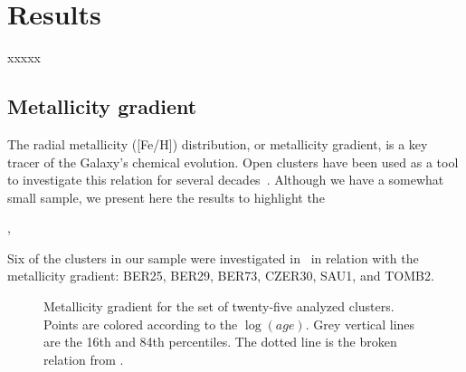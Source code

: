\documentclass{aa}
\begin{document}
\section{Results}
 \label{sec:results}

 xxxxx


 \subsection{Metallicity gradient}
  \label{ssec:met_gradient}

  The radial metallicity ([Fe/H]) distribution, or metallicity gradient, is a
  key tracer of the Galaxy's chemical evolution. Open clusters have been used as
  a tool to investigate this relation for several decades~\citep{Janes_1979}.
  Although we have a somewhat small sample, we present here the results to
  highlight the 

  \cite{Donor_2020}, 

  Six of the clusters in our sample were investigated in~\cite{Netopil_2021} in
  relation with the metallicity gradient: BER25, BER29, BER73, CZER30, SAU1,
  and TOMB2.


  \begin{figure}
   \caption{Metallicity gradient for the set of twenty-five analyzed clusters.
   Points are colored according to the $\log(age)$. Grey vertical lines are the
   16th and 84th percentiles. The dotted line is the broken relation from 
   \citet[][Fig 7]{Donor_2020}.}
   \label{fig:met_gradient}
  \end{figure}
\end{document}
